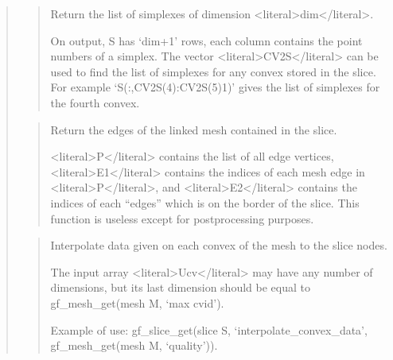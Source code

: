 \documentclass[a4paper,11pt,english]{sphinxmanual}
\begin{document}
\begin{quote}
\sphinxAtStartPar
{}
\begin{quote}

\sphinxAtStartPar
Return the list of simplexes of dimension \textless{}literal\textgreater{}dim\textless{}/literal\textgreater{}.

\sphinxAtStartPar
On output, S has ‘dim+1’ rows, each column contains the point
numbers of a simplex.  The vector \textless{}literal\textgreater{}CV2S\textless{}/literal\textgreater{} can be used to find the
list of simplexes for any convex stored in the slice. For example
‘S(:,CV2S(4):CV2S(5)\sphinxhyphen{}1)’
gives the list of simplexes for the fourth convex.
\end{quote}

\sphinxAtStartPar
{}
\begin{quote}

\sphinxAtStartPar
Return the edges of the linked mesh contained in the slice.

\sphinxAtStartPar
\textless{}literal\textgreater{}P\textless{}/literal\textgreater{} contains the list of all edge vertices, \textless{}literal\textgreater{}E1\textless{}/literal\textgreater{} contains
the indices of each mesh edge in \textless{}literal\textgreater{}P\textless{}/literal\textgreater{}, and \textless{}literal\textgreater{}E2\textless{}/literal\textgreater{} contains the
indices of each “edges” which is on the border of the slice.
This function is useless except for post\sphinxhyphen{}processing purposes.
\end{quote}

\sphinxAtStartPar
{}
\begin{quote}

\sphinxAtStartPar
Interpolate data given on each convex of the mesh to the slice nodes.

\sphinxAtStartPar
The input array \textless{}literal\textgreater{}Ucv\textless{}/literal\textgreater{} may have any number of dimensions, but its
last dimension should be equal to gf\_mesh\_get(mesh M, ‘max cvid’).

\sphinxAtStartPar
Example of use: gf\_slice\_get(slice S, ‘interpolate\_convex\_data’, gf\_mesh\_get(mesh M, ‘quality’)).
\end{quote}


\end{quote}
\end{document}
